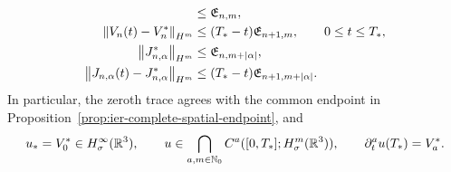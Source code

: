 \begin{theorem}
\begin{align}
 &\le\mathfrak E_{n,m},
 \label{eq:ier-endpoint-velocity-size}\\
 \left\lVert V_n(t)-V_n^*\right\rVert_{H^m}
 &\le(T_*-t)\mathfrak E_{n+1,m},
 \qquad0\le t\le T_*,
 \label{eq:ier-endpoint-velocity-modulus}\\
 \left\lVert J_{n,\alpha}^*\right\rVert_{H^m}
 &\le\mathfrak E_{n,m+|\alpha|},
 \label{eq:ier-endpoint-mixed-size}\\
 \left\lVert J_{n,\alpha}(t)-J_{n,\alpha}^*\right\rVert_{H^m}
 &\le(T_*-t)\mathfrak E_{n+1,m+|\alpha|}.
 \label{eq:ier-endpoint-mixed-modulus}
\end{align}
 In particular, the zeroth trace agrees with the common endpoint in
 Proposition~\ref{prop:ier-complete-spatial-endpoint}, and
\begin{equation}
 u_*=V_0^*\in H^\infty_\sigma(\mathbb R^3),
 \qquad
 u\in\bigcap_{a,m\in\mathbb N_0}C^a([0,T_*];H^m_\sigma(\mathbb R^3)),
 \qquad
 \partial_t^au(T_*)=V_a^*.
 \label{eq:ier-complete-left-velocity-jet}
\end{equation}
\end{theorem}

